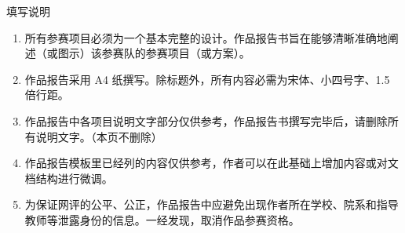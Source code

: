 \thispagestyle{empty}
\begin{center}
  {\heiti{}填写说明\par}
\end{center}
\vspace{7mm}

\begin{enumerate}
  \item 所有参赛项目必须为一个基本完整的设计。作品报告书旨在能够清晰准确地阐述（或图示）该参赛队的参赛项目（或方案）。
  \item 作品报告采用 A4 纸撰写。除标题外，所有内容必需为宋体、小四号字、1.5 倍行距。
  \item 作品报告中各项目说明文字部分仅供参考，作品报告书撰写完毕后，请删除所有说明文字。（本页不删除）
  \item 作品报告模板里已经列的内容仅供参考，作者可以在此基础上增加内容或对文档结构进行微调。
  \item 为保证网评的公平、公正，作品报告中应避免出现作者所在学校、院系和指导教师等泄露身份的信息。一经发现，取消作品参赛资格。
\end{enumerate}
\clearpage
